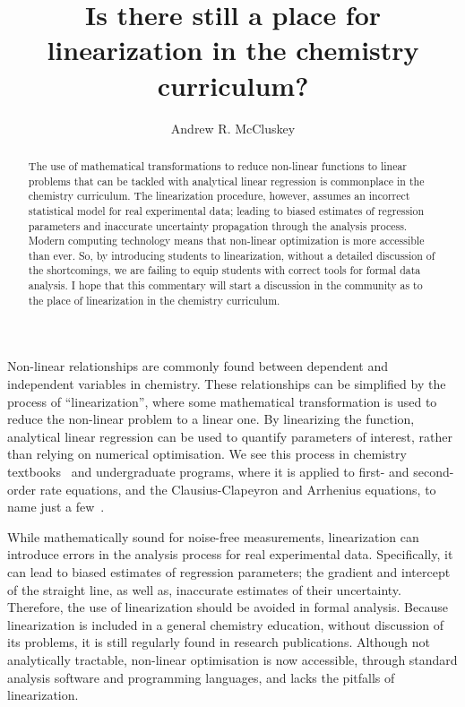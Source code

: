 \documentclass[journal=jceda8,manuscript=article]{achemso}
\author{Andrew R. McCluskey}
\affiliation{European Spallation Source ERIC, Ole Maaløes vej 3, 2200 København N, DK}
\title{Is there still a place for linearization in the chemistry curriculum?}
\begin{document}
\begin{abstract}
    The use of mathematical transformations to reduce non-linear functions to linear problems that can be tackled with analytical linear regression is commonplace in the chemistry curriculum. 
    The linearization procedure, however, assumes an incorrect statistical model for real experimental data; leading to biased estimates of regression parameters and inaccurate uncertainty propagation through the analysis process. 
    Modern computing technology means that non-linear optimization is more accessible than ever. 
    So, by introducing students to linearization, without a detailed discussion of the shortcomings, we are failing to equip students with correct tools for formal data analysis. 
    I hope that this commentary will start a discussion in the community as to the place of linearization in the chemistry curriculum. 
\end{abstract}

\maketitle 

Non-linear relationships are commonly found between dependent and independent variables in chemistry.
These relationships can be simplified by the process of ``linearization'', where some mathematical transformation is used to reduce the non-linear problem to a linear one. 
By linearizing the function, analytical linear regression can be used to quantify parameters of interest, rather than relying on numerical optimisation. 
We see this process in chemistry textbooks~\cite{monk_math_2010,atkins_physical_2018} and undergraduate programs, where it is applied to first- and second-order rate equations, and the Clausius-Clapeyron and Arrhenius equations, to name just a few~\cite{perrin_linear_2017,harper_data_2017,monk_math_2010}.

While mathematically sound for noise-free measurements, linearization can introduce errors in the analysis process for real experimental data. 
Specifically, it can lead to biased estimates of regression parameters; the gradient and intercept of the straight line, as well as, inaccurate estimates of their uncertainty. 
Therefore, the use of linearization should be avoided in formal analysis.
Because linearization is included in a general chemistry education, without discussion of its problems, it is still regularly found in research publications. 
Although not analytically tractable, non-linear optimisation is now accessible, through standard analysis software and programming languages, and lacks the pitfalls of linearization. 
\end{document}
